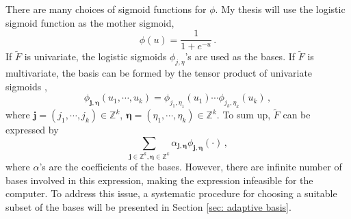 There are many choices of sigmoid functions for $\phi$.
My thesis will use the logistic sigmoid function as the mother sigmoid,
\begin{equation}
    \phi(u) = \frac{1}{1+ e^{-u}}\,.
    \label{eqn: logistic sigmoid}
\end{equation}
If $\tilde{F}$ is univariate, the logistic sigmoids $\phi_{j,\eta}$'s are used as the bases.
If $\tilde{F}$ is multivariate, the basis can be formed by the tensor product 
of univariate sigmoids \cite{functional analysis},
\begin{equation}
    \phi_{\boldsymbol{j}, \boldsymbol{\eta}} (u_1, \cdots, u_k) = \phi_{j_1, \eta_1}(u_1)\cdots
    \phi_{j_k, \eta_k}(u_k)\,,
    \label{eqn: tensor basis}
\end{equation}
where $\boldsymbol{j}=(j_1, \cdots, j_k)\in \mathbb{Z}^k$, 
$\boldsymbol{\eta} = (\eta_1, \cdots, \eta_k) \in \mathbb{Z}^k$. To sum up,
$\tilde{F}$ can be expressed by
$$
    \sum_{\boldsymbol{j}\in \mathbb{Z}^k, \boldsymbol{\eta}\in \mathbb{Z}^k} 
                       \alpha_{\boldsymbol{j}, \boldsymbol{\eta}}
                       \phi_{\boldsymbol{j}, \boldsymbol{\eta}} (\cdot)\,,
$$
where $\alpha$'s are the coefficients of the bases. However, there are infinite number of bases involved
in this expression, making the expression infeasible for the computer. To address this issue,
a systematic procedure for choosing
a suitable subset of the bases %
will be presented in Section \ref{sec: adaptive basis}.
\\

